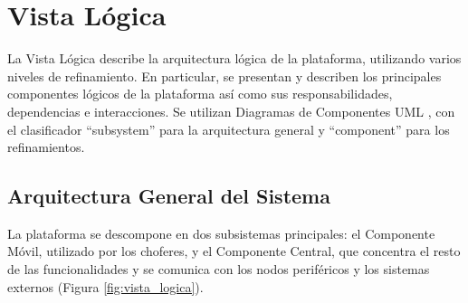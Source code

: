\section{Vista Lógica}\label{sec:vista-logica}

La Vista Lógica describe la arquitectura lógica de la plataforma, utilizando varios niveles de refinamiento. En particular, se presentan y describen los principales componentes lógicos de la plataforma así como sus responsabilidades, dependencias e interacciones. Se utilizan Diagramas de Componentes UML \cite{Ambysoft2018b}, con el clasificador \enquote{subsystem} para la arquitectura general y \enquote{component} para los refinamientos.

\subsection{Arquitectura General del Sistema}

La plataforma se descompone en dos subsistemas principales: el Componente Móvil, utilizado por los choferes, y el Componente Central, que concentra el resto de las funcionalidades y se comunica con los nodos periféricos y los sistemas externos (Figura \ref{fig:vista_logica}).

